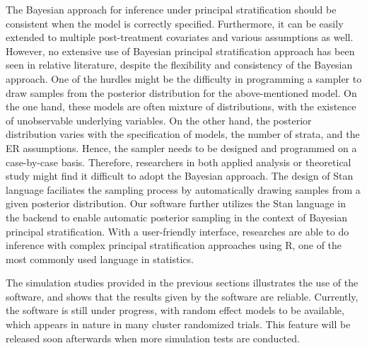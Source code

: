 \documentclass{article}
\begin{document}
The Bayesian approach for inference under principal stratification should be consistent when the model is correctly specified. Furthermore, it can be easily extended to multiple post-treatment covariates and various assumptions as well. However, no extensive use of Bayesian principal stratification approach has been seen in relative literature, despite the flexibility and consistency of the Bayesian approach. One of the hurdles might be the difficulty in programming a sampler to draw samples from the posterior distribution for the above-mentioned model. On the one hand, these models are often mixture of distributions, with the existence of unobservable underlying variables. On the other hand, the posterior distribution varies with the specification of models, the number of strata, and the ER assumptions. Hence, the sampler needs to be designed and programmed on a case-by-case basis. Therefore, researchers in both applied analysis or theoretical study might find it difficult to adopt the Bayesian approach. The design of Stan language faciliates the sampling process by automatically drawing samples from a given posterior distribution. Our software further utilizes the Stan language in the backend to enable automatic posterior sampling in the context of Bayesian principal stratification. With a user-friendly interface, researches are able to do inference with complex principal stratification approaches using \textsf{R}, one of the most commonly used language in statistics. 

The simulation studies provided in the previous sections illustrates the use of the software, and shows that the results given by the software are reliable. Currently, the software is still under progress, with random effect models to be available, which appears in nature in many cluster randomized trials. This feature will be released soon afterwards when more simulation tests are conducted.


\end{document}

